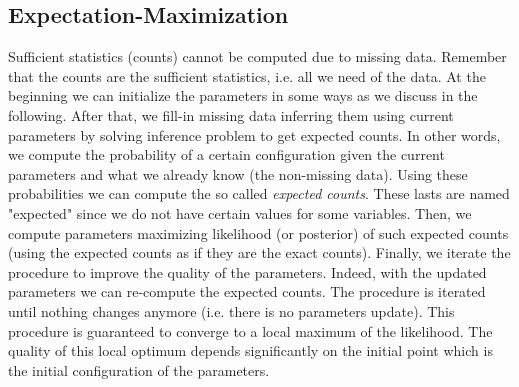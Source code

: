 \subsection{Expectation-Maximization}
Sufficient statistics (counts) cannot be computed due to missing data. Remember that the counts are the sufficient statistics, i.e. all we need of the data. At the beginning we can initialize the parameters in some ways as we discuss in the following. After that, we fill-in missing data inferring them using current parameters by solving inference problem to get expected counts. In other words, we compute the probability of a certain configuration given the current parameters and what we already know (the non-missing data). Using these probabilities we can compute the so called \textit{expected counts}. These lasts are named "expected" since we do not have certain values for some variables. Then, we compute parameters maximizing likelihood (or posterior) of such expected counts (using the expected counts as if they are the exact counts). Finally, we iterate the procedure to improve the quality of the parameters. Indeed, with the updated parameters we can re-compute the expected counts. The procedure is iterated until nothing changes anymore (i.e. there is no parameters update). This procedure is guaranteed to converge to a local maximum of the likelihood. The quality of this local optimum depends significantly on the initial point which is the initial configuration of the parameters.

